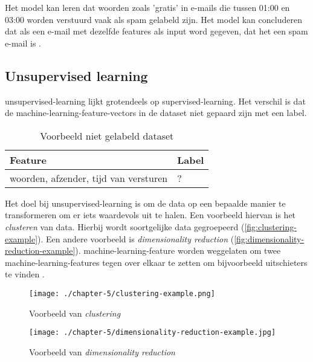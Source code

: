 Het model kan leren dat woorden zoals 'gratis' in e-mails die tussen 01:00 en 03:00 worden verstuurd vaak als spam gelabeld zijn. Het model kan concluderen dat als een e-mail met dezelfde features als input word gegeven, dat het een spam e-mail is \cite{google-ml-terminology}.

\subsection{Unsupervised learning}\label{subsec:unsupervised-learning}
\Gls{unsupervised-learning} lijkt grotendeels op \gls{supervised-learning}. Het verschil is dat de \glspl{machine-learning-feature-vector} in de dataset niet gepaard zijn met een label. 

\begin{table}[hbt!]
  \centering
  \begin{tabular}{|l|l|}
  \hline
  \textbf{Feature} & \textbf{Label} \\ \hline
  woorden, afzender, tijd van versturen&?\\ \hline
  \end{tabular}
  \caption{Voorbeeld niet gelabeld dataset}
  \label{table:voorbeeld-niet-gelabeld-dataset}
\end{table}

Het doel bij \gls{unsupervised-learning} is om de data op een bepaalde manier te transformeren om er iets waardevols uit te halen. Een voorbeeld hiervan is het \textit{clusteren} van data. Hierbij wordt soortgelijke data gegroepeerd (\autoref{fig:clustering-example}). Een andere voorbeeld is \textit{dimensionality reduction} (\autoref{fig:dimensionality-reduction-example}). \Gls{machine-learning-feature} worden weggelaten om twee \glspl{machine-learning-feature} tegen over elkaar te zetten om bijvoorbeeld uitschieters te vinden \cite{the-hundred-page-machine-learning-book}.

\begin{figure}[hbt!]
    \centering
    \begin{minipage}{0.3\textwidth}
        \centering
        \texttt{[image: ./chapter-5/clustering-example.png]}
        \caption{Voorbeeld van \textit{clustering}}
        \label{fig:clustering-example}
    \end{minipage}\hfill
    \begin{minipage}{0.6\textwidth}
        \centering
        \texttt{[image: ./chapter-5/dimensionality-reduction-example.jpg]}
        \caption{Voorbeeld van \textit{dimensionality reduction}}
        \label{fig:dimensionality-reduction-example}
    \end{minipage}
\end{figure}

